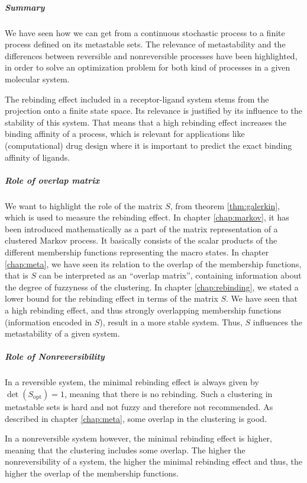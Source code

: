 
\subparagraph*{Summary}
We have seen how we can get from a continuous stochastic process to a finite process defined on its metastable sets.
The relevance of metastability and the differences between reversible and nonreversible processes have been highlighted, in order to solve an optimization problem for both kind of processes in a given molecular system.

The rebinding effect included in a receptor-ligand system stems from the projection onto a finite state space.
Its relevance is justified by its influence to the stability of this system. That means that a high rebinding effect increases the binding affinity of a process, which is relevant for applications like (computational) drug design where it is important to predict the exact binding affinity of ligands.

\subparagraph*{Role of overlap matrix}
We want to highlight the role of the matrix $S$, from theorem \ref{thm:galerkin}, which is used to measure the rebinding effect.
In chapter \ref{chap:markov}, it has been introduced mathematically as a part of the matrix representation of a clustered Markov process. It basically consists of the scalar products of the different membership functions representing the macro states. %
In chapter \ref{chap:meta}, we have seen its relation to the overlap of the membership functions, that is $S$ can be interpreted as an ``overlap matrix'', containing information about the degree of fuzzyness of the clustering.
In chapter \ref{chap:rebinding}, we stated a lower bound for the rebinding effect in terms of the matrix $S$.
We have seen that a high rebinding effect, and thus strongly overlapping membership functions (information encoded in $S$), result in a more stable system. Thus, $S$ influences the metastability of a given system.
\noindent{}

\subparagraph*{Role of Nonreversibility}

In a reversible system, the minimal rebinding effect is always given by $\det(S_{\textrm{opt}}) = 1$, meaning that there is no rebinding. Such a clustering in metastable sets is hard and not fuzzy and therefore not recommended. As described in chapter \ref{chap:meta}, some overlap in the clustering is good.

In a nonreversible system however, the minimal rebinding effect is higher, meaning that the clustering includes some overlap.
The higher the nonreversibility of a system, the higher the minimal rebinding effect and thus, the higher the overlap of the membership functions.

